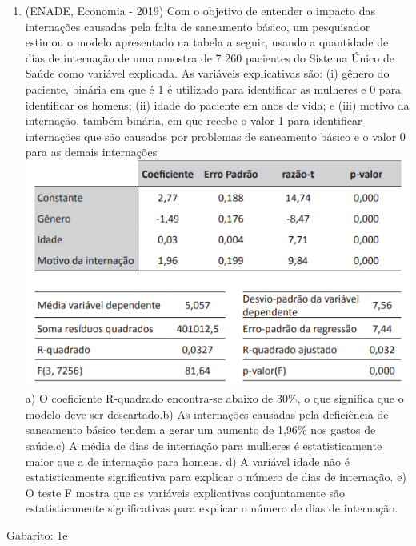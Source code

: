 \documentclass[
]{book}
\providecommand{\tightlist}{%
  \setlength{\itemsep}{0pt}\setlength{\parskip}{0pt}}
\newenvironment{question}{
  \definecolor{shadecolor}{rgb}{0, 0, 0}  %
  \color{white}
  \begin{shaded}}
 {\end{shaded}}
\begin{document}
\begin{question}

\begin{enumerate}
\def\labelenumi{\arabic{enumi}.}
\tightlist
\item
  (ENADE, Economia - 2019) Com o objetivo de entender o impacto das internações causadas pela falta de saneamento básico, um pesquisador estimou o modelo apresentado na tabela a seguir, usando a quantidade de dias de internação de uma amostra de 7 260 pacientes do Sistema Único de Saúde como variável explicada. As variáveis explicativas são: (i) gênero do paciente, binária em que é 1 é utilizado para identificar as mulheres e 0 para identificar os homens; (ii) idade do paciente em anos de vida; e (iii) motivo da internação, também binária, em que recebe o valor 1 para identificar internações que são causadas por problemas de saneamento básico e o valor 0 para as demais internações\includegraphics{./img/exercicio_regressao.png}a) O coeficiente R-quadrado encontra-se abaixo de 30\%, o que significa que o modelo deve ser descartado.b) As internações causadas pela deficiência de saneamento básico tendem a gerar um aumento de 1,96\% nos gastos de saúde.c) A média de dias de internação para mulheres é estatisticamente maior que a de internação para homens. d) A variável idade não é estatisticamente significativa para explicar o número de dias de internação. e) O teste F mostra que as variáveis explicativas conjuntamente são estatisticamente significativas para explicar o número de dias de internação.\\
\end{enumerate}

\end{question}

Gabarito: 1e
\end{document}
